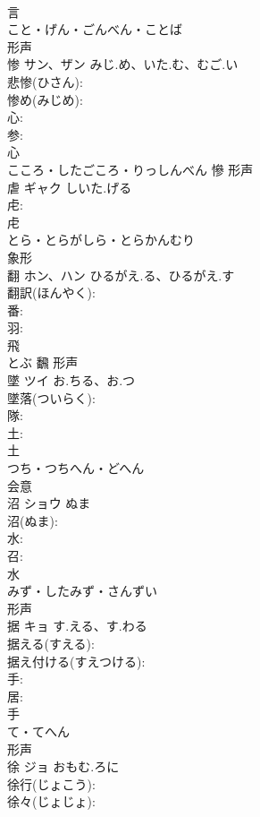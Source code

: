 \documentclass[8pt]{extreport}
\begin{document}
\begin{CJK}{UTF8}{min}
\\	言	
\\	こと・げん・ごんべん・ことば	
\\	形声 
\\	惨	サン、ザン	みじ.め、いた.む、むご.い		
\\	悲惨(ひさん): 
\\	惨め(みじめ): 
\\	心: 
\\	参: 
\\	心	
\\	こころ・したごころ・りっしんべん	慘	形声 
\\	虐	ギャク	しいた.げる		
\\	虍: 
\\	虍	
\\	とら・とらがしら・とらかんむり	
\\	象形 
\\	翻	ホン、ハン	ひるがえ.る、ひるがえ.す		
\\	翻訳(ほんやく): 
\\	番: 
\\	羽: 
\\	飛	
\\	とぶ	飜	形声 
\\	墜	ツイ	お.ちる、お.つ		
\\	墜落(ついらく): 
\\	隊: 
\\	土: 
\\	土	
\\	つち・つちへん・どへん	
\\	会意 
\\	沼	ショウ	ぬま		
\\	沼(ぬま): 
\\	水: 
\\	召: 
\\	水	
\\	みず・したみず・さんずい	
\\	形声 
\\	据	キョ	す.える、す.わる		
\\	据える(すえる): 
\\	据え付ける(すえつける): 
\\	手: 
\\	居: 
\\	手	
\\	て・てへん	
\\	形声 
\\	徐	ジョ	おもむ.ろに		
\\	徐行(じょこう): 
\\	徐々(じょじょ): 

\end{CJK}
\end{document}
